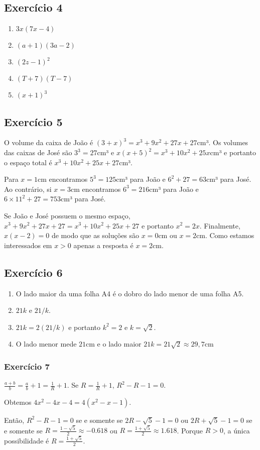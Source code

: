 \subsection*{Exercício 4}

\begin{enumerate}
\item $3x (7x - 4)$
\item $(a+1)(3a-2)$
\item $(2z-1)^2$
\item $(T+7)(T-7)$
\item $(x+1)^3$
\end{enumerate}

\subsection*{Exercício 5}

O volume da caixa de João é $(3+x)^3 = x^3+9x^2+27x+27$cm³. Os volumes das
caixas de José são $3^3=27$cm³ e $x(x+5)^2 = x^3+10x^2+25x$cm³ e portanto o
espaço total é $x^3+10x^2+25x + 27$cm³.

Para $x=1$cm encontramos $5^3 = 125$cm³ para João e $6^2 + 27 = 63$cm³ para
José. Ao contrário, si $x=3$cm encontramos $6^3 = 216$cm³ para João e
$6\times11^2 + 27 = 753$cm³ para José.

Se João e José possuem o mesmo espaço,
$x^3+9x^2+27x+27 = x^3+10x^2+25x + 27$ e portanto
$x^2 = 2x$. Finalmente, $x(x-2) = 0$ de modo que as soluções são
$x=0$cm ou $x = 2$cm. Como estamos interessados em $x > 0$ apenas a resposta é
$x = 2$cm.

\subsection*{Exercício 6}

\begin{enumerate}
\item O lado maior da uma folha A4 é o dobro do lado menor de uma folha A5.
\item $21k$ e $21/k$.
\item $21k = 2 (21/k)$ e portanto $k^2 = 2$ e $k = \sqrt{2}$.
\item O lado menor mede $21$cm e o lado maior $21k = 21\sqrt{2} \approx
  29,7\text{cm}$
\end{enumerate}

\subsubsection*{Exercício 7}

$\frac{a+b}{b} = \frac{a}{b} + 1  = \frac{1}{R} + 1$. Se
$R = \frac{1}{R} + 1$, $R^2 - R - 1 = 0$.

Obtemos $4x^2-4x-4 = 4(x^2-x-1)$.

Então, $R^2 - R - 1 = 0$ se e somente se
$2R - \sqrt{5} - 1 = 0$ ou $2R + \sqrt{5} - 1 = 0$ se e somente se
$R = \frac{1 - \sqrt{5}}{2} \approx -0.618$ ou
$R = \frac{1 + \sqrt{5}}{2} \approx 1.618$. Porque $R > 0$,
a única possibilidade é $R = \frac{1 + \sqrt{5}}{2}$.
